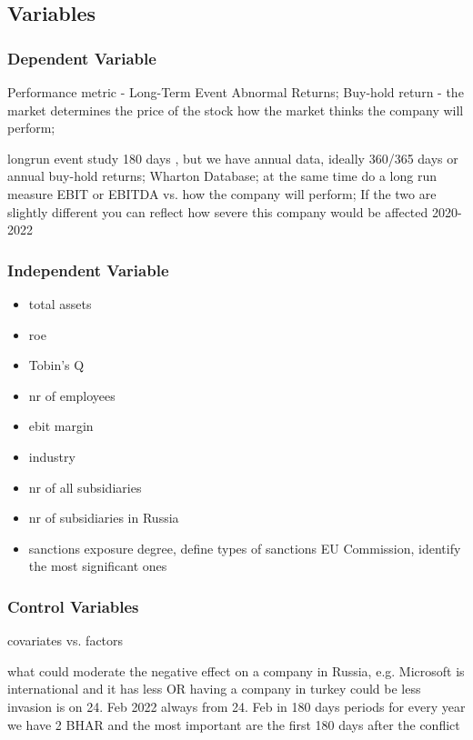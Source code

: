 \documentclass[12pt,a4paper]{article}
\begin{document}
\subsection{Variables}
\subsubsection{Dependent Variable}

Performance metric - Long-Term Event Abnormal Returns;
Buy-hold return - the market determines the price of the stock  how the market thinks the company will perform; 

longrun event study 180 days , but we have annual data, ideally 360/365 days or annual buy-hold returns; Wharton Database; at the same time do a long run measure EBIT or EBITDA vs. how the company will perform; If the two are slightly different you can reflect how severe this company would be affected 
2020-2022

\subsubsection{Independent Variable}
\begin{itemize}
  \item total assets
  \item roe
  \item Tobin's Q
  \item nr of employees
  \item ebit margin
  \item industry
  \item nr of all subsidiaries 
  \item nr of subsidiaries in Russia
  
  \item sanctions exposure degree, define types of sanctions EU Commission, identify the most significant ones 
\end{itemize}


\subsubsection{Control Variables}
covariates vs. factors 

what could moderate the negative effect on a company in Russia, e.g. Microsoft is international and it has less OR having a company in turkey could be less
invasion is on 24. Feb 2022 
always from 24. Feb in 180 days periods
for every year we have 2 BHAR and the most important are the first 180 days after the conflict 
\end{document}

